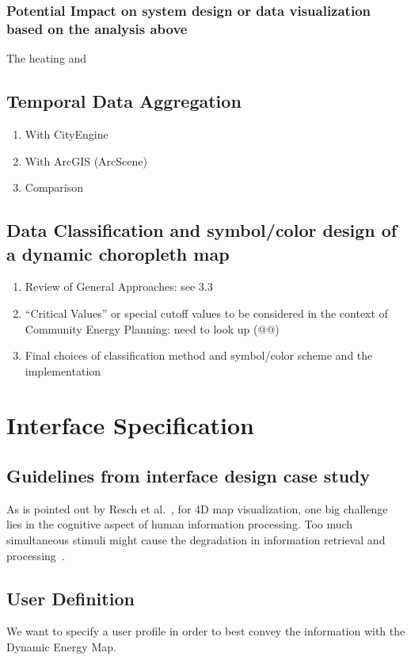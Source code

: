 \documentclass[hidelinks,12pt]{article}
\begin{document}
\subsubsection{Potential Impact on system design or data visualization
  based on the analysis above}
The heating and 
\subsection{Temporal Data Aggregation}
      \begin{enumerate}[label*=\arabic*.]
      \item With CityEngine
      \item With ArcGIS (ArcScene)
      \item Comparison
      \end{enumerate}
\subsection{Data Classification and symbol/color design of a
        dynamic choropleth map}
    \begin{enumerate}[label*=\arabic*.]
    \item Review of General Approaches: see 3.3
    \item ``Critical Values'' or special cutoff values to be
      considered in the context of Community Energy Planning: need to
      look up (@@)
    \item Final choices of classification method and symbol/color
      scheme and the implementation
    \end{enumerate}

\newpage
\section{Interface Specification}
\subsection{Guidelines from interface design case study}
As is pointed out by Resch et al.\ , for 4D map visualization, one big
challenge lies in the cognitive aspect of human information
processing. Too much simultaneous stimuli might cause the degradation
in information retrieval and processing~\cite{Resch2014}. 

\subsection{User Definition}
We want to specify a user profile in order to best convey the
information with the Dynamic Energy Map.
\end{document}
